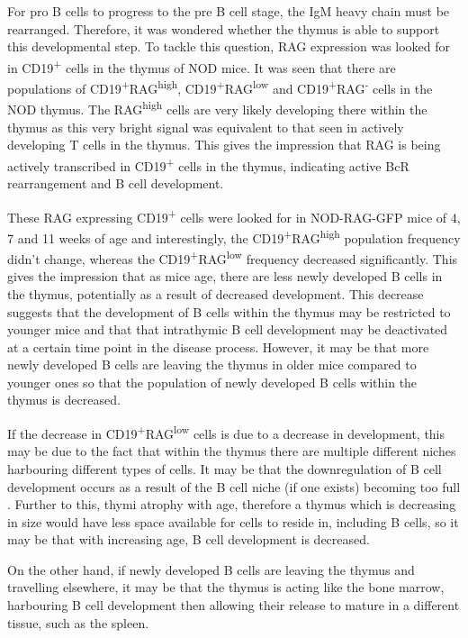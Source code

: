 For pro B cells to progress to the pre B cell stage, the IgM heavy chain must be rearranged.
Therefore, it was wondered whether the thymus is able to support this developmental step.
To tackle this question, RAG expression was looked for in CD19\textsuperscript{+} cells in the thymus of NOD mice.
It was seen that there are populations of CD19\textsuperscript{+}RAG\textsuperscript{high}, CD19\textsuperscript{+}RAG\textsuperscript{low} and CD19\textsuperscript{+}RAG\textsuperscript{-} cells in the NOD thymus.
The RAG\textsuperscript{high} cells are very likely developing there within the thymus as this very bright signal was equivalent to that seen in actively developing T cells in the thymus.
This gives the impression that RAG is being actively transcribed in CD19\textsuperscript{+} cells in the thymus, indicating active BcR rearrangement and B cell development.

These RAG expressing CD19\textsuperscript{+} cells were looked for in NOD-RAG-GFP mice of 4, 7 and 11 weeks of age and interestingly, the CD19\textsuperscript{+}RAG\textsuperscript{high} population frequency didn't change, whereas the CD19\textsuperscript{+}RAG\textsuperscript{low} frequency decreased significantly.
This gives the impression that as mice age, there are less newly developed B cells in the thymus, potentially as a result of decreased development.
This decrease suggests that the development of B cells within the thymus may be restricted to younger mice and that that intrathymic B cell development may be deactivated at a certain time point in the disease process.
However, it may be that more newly developed B cells are leaving the thymus in older mice compared to younger ones so that the population of newly developed B cells within the thymus is decreased.

If the decrease in CD19\textsuperscript{+}RAG\textsuperscript{low} cells is due to a decrease in development, this may be due to the fact that within the thymus there are multiple different niches harbouring different types of cells.
It may be that the downregulation of B cell development occurs as a result of the B cell niche (if one exists) becoming too full .
Further to this, thymi atrophy with age, therefore a thymus which is decreasing in size would have less space available for cells to reside in, including B cells, so it may be that with increasing age, B cell development is decreased. 

On the other hand, if newly developed B cells are leaving the thymus and travelling elsewhere, it may be that the thymus is acting like the bone marrow, harbouring B cell development then allowing their release to mature in a different tissue, such as the spleen.

